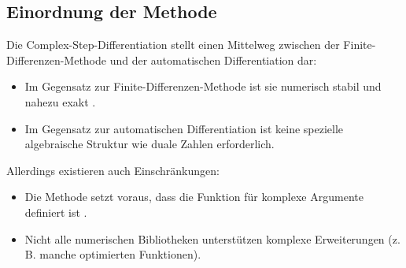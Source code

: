 \subsection{Einordnung der Methode}

Die Complex-Step-Differentiation stellt einen Mittelweg zwischen der Finite-Differenzen-Methode und der automatischen Differentiation dar:

\begin{itemize}
	\item Im Gegensatz zur Finite-Differenzen-Methode ist sie numerisch stabil und nahezu exakt \cite{step:squire1998}.
	\item Im Gegensatz zur automatischen Differentiation ist keine spezielle algebraische Struktur wie duale Zahlen erforderlich.
\end{itemize}
Allerdings existieren auch Einschränkungen:
\begin{itemize}
	\item Die Methode setzt voraus, dass die Funktion für komplexe Argumente definiert ist \cite{step:martins2003}.
	\item Nicht alle numerischen Bibliotheken unterstützen komplexe Erweiterungen (z.\,B. manche optimierten Funktionen).
\end{itemize}


